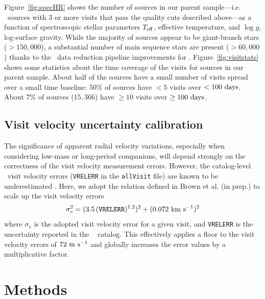 \documentclass[modern]{aastex63}
\begin{document}
Figure~\ref{fig:specHR} shows the number of sources in our parent sample---i.e.
\apogee\ sources with 3 or more visits that pass the quality cuts described
above---as a function of spectroscopic stellar parameters $T_{\rm eff}$,
effective temperature, and $\log g$, log-surface gravity.
While the majority of sources appear to be giant-branch stars ($>150,000$), a
substantial number of main sequence stars are present ($>60,000$) thanks to the
\apogee\ data reduction pipeline improvements for .
Figure~\ref{fig:visitstats} shows some statistics about the time coverage of the
visits for sources in our parent sample.
About half of the sources have a small number of visits spread over a small time
baseline: $50\%$ of sources have $<5$ visits over $<100~{\rm days}$.
About $7\%$ of sources ($15,366$) have $\geq 10$ visits over $\geq 100~{\rm
days}$.


\subsection{Visit velocity uncertainty calibration} \label{sec:visitcalib}

The significance of apparent radial velocity variations, especially when
considering low-mass or long-period companions, will depend strongly on the
correctness of the visit velocity measurement errors.
However, the catalog-level \apogee\ visit velocity errors (\texttt{VRELERR} in
the \texttt{allVisit} file) are known to be underestimated
\citep[e.g.,][]{Cottaar:2014}.
Here, we adopt the relation defined in Brown et al. (in prep.) to scale up the
visit velocity errors
\begin{equation}
    \sigma_v^2 = (3.5\,(\texttt{VRELERR})^{1.2})^2 + (0.072~\kms)^2 \label{eq:verr}
\end{equation}
where $\sigma_v$ is the adopted visit velocity error for a given visit, and
\texttt{VRELERR} is the uncertainty reported in the \apogee\  catalog.
This effectively applies a floor to the visit velocity errors of $72~\mathrm{m}~\mathrm{s}^{-1}$ and
globally increases the error values by a multiplicative factor.


\section{Methods} \label{sec:methods}
\end{document}
